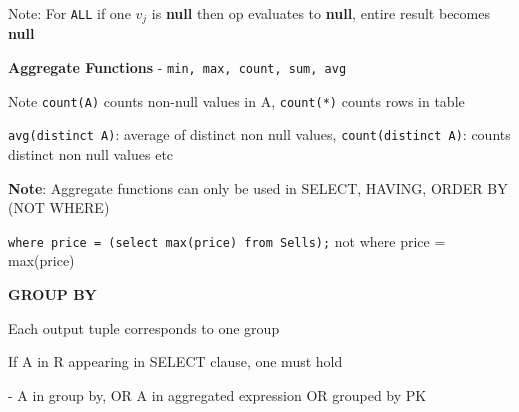 \documentclass[10pt, a4paper]{article}
\newcommand{\highlight}[1]{{\color{red}\textbf{#1}}}
\newcommand{\red}[1]{{\color{red}#1}}
\newcommand{\tab}[0]{\hspace*{2mm}}
\begin{document}
\begin{multicols*}{3}











		\red{Note}: For \texttt{ALL} if one $v_j$ is \textbf{null} then op evaluates to \textbf{null}, entire result becomes \textbf{null}





		\textbf{Aggregate Functions} - \texttt{min, max, count, sum, avg}

		Note \texttt{count(A)} counts non-null values in A, \texttt{count(*)} counts rows in table

		\texttt{avg(distinct A)}: average of distinct non null values, \texttt{count(distinct A)}: counts distinct non null values etc

		\highlight{Note}: Aggregate functions can only be used in SELECT, HAVING, ORDER BY (\red{NOT WHERE})

		\texttt{where price = (select max(price) from Sells);} \red{not} where price = max(price)

		{\bf \textbf{GROUP BY}}

		Each output tuple corresponds to one group

		If A in R appearing in SELECT clause, one must hold

		\tab - A in \red{group by}, OR A in \red{aggregated expression} OR \red{grouped by PK}


\end{multicols*}
\end{document}
